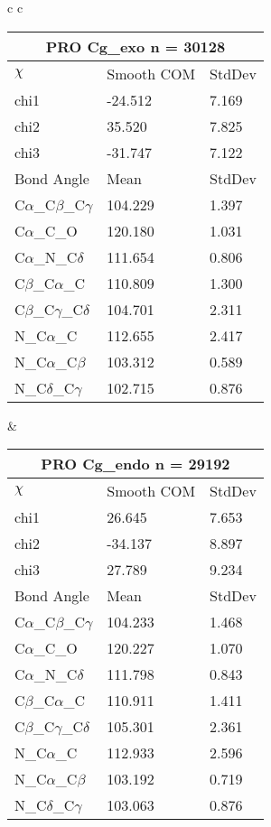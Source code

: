 \begin{longtable}{ c c }

  \begin{tabular}{ l l l }
  \toprule
  \multicolumn{3}{c}{PRO \textbf{Cg\_exo} n = 30128} \\ \toprule
  $\chi$       & Smooth COM & StdDev \\ \midrule
  chi1 & -24.512 & 7.169 \\ 
  chi2 & 35.520 & 7.825 \\ 
  chi3 & -31.747 & 7.122 \\ \midrule
  Bond Angle   & Mean     & StdDev \\ \midrule
  C$\alpha$\_C$\beta$\_C$\gamma$ & 104.229 & 1.397\\
  C$\alpha$\_C\_O & 120.180 & 1.031\\
  C$\alpha$\_N\_C$\delta$ & 111.654 & 0.806\\
  C$\beta$\_C$\alpha$\_C & 110.809 & 1.300\\
  C$\beta$\_C$\gamma$\_C$\delta$ & 104.701 & 2.311\\
  N\_C$\alpha$\_C & 112.655 & 2.417\\
  N\_C$\alpha$\_C$\beta$ & 103.312 & 0.589\\
  N\_C$\delta$\_C$\gamma$ & 102.715 & 0.876\\
  \bottomrule
  \end{tabular}
  &
  \begin{tabular}{ l l l }
  \toprule
  \multicolumn{3}{c}{PRO \textbf{Cg\_endo} n = 29192} \\ \toprule
  $\chi$       & Smooth COM & StdDev \\ \midrule
  chi1 & 26.645 & 7.653 \\ 
  chi2 & -34.137 & 8.897 \\ 
  chi3 & 27.789 & 9.234 \\ \midrule
  Bond Angle   & Mean     & StdDev \\ \midrule
  C$\alpha$\_C$\beta$\_C$\gamma$ & 104.233 & 1.468\\
  C$\alpha$\_C\_O & 120.227 & 1.070\\
  C$\alpha$\_N\_C$\delta$ & 111.798 & 0.843\\
  C$\beta$\_C$\alpha$\_C & 110.911 & 1.411\\
  C$\beta$\_C$\gamma$\_C$\delta$ & 105.301 & 2.361\\
  N\_C$\alpha$\_C & 112.933 & 2.596\\
  N\_C$\alpha$\_C$\beta$ & 103.192 & 0.719\\
  N\_C$\delta$\_C$\gamma$ & 103.063 & 0.876\\
  \bottomrule
  \end{tabular}
  \\
  
\end{longtable}    

